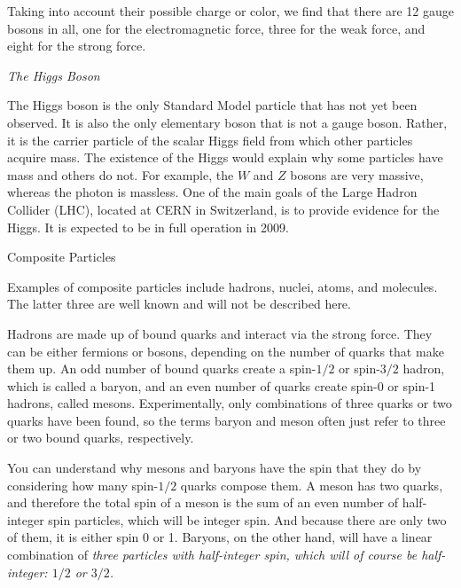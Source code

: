 \documentclass[12pt,epsf]{article}
\makeatletter
\def\subsection{\@startsection{subsection}{2}{\z@}{2.3ex plus .2ex}
 {2.3ex plus .2ex}{\bf}}
\makeatother
\begin{document}
Taking into account their possible charge or color, we find that there
are 12 gauge bosons in all, one for the electromagnetic force, three for the
weak force, and eight for the strong force. 

\begin{center}
\it The Higgs Boson \rm
\end{center}

The Higgs boson is the only Standard Model particle that has not yet
been observed.	It is also the only elementary boson that is not a
gauge boson.  Rather, it is the carrier particle of the scalar Higgs
field from which other particles acquire mass.	The existence of the
Higgs would explain why some particles have mass and others do not. 
For example, the $W$ and $Z$ bosons are very massive, whereas the
photon is massless.  One of the main goals of the Large Hadron Collider
(LHC), located at CERN in Switzerland, is to provide evidence for
the Higgs.  It is expected to be in full operation in 2009.

\subsection{Composite Particles}

Examples of composite particles include hadrons, nuclei, atoms, and
molecules.  The latter three are well known and will not be
described here. 

Hadrons are made up of bound quarks and interact via the strong force.
They can be either fermions or bosons, depending on the number of
quarks that make them up. An odd number of bound quarks create a
spin-$1/2$ or spin-$3/2$ hadron, which is called a baryon, and an even
number of quarks create spin-0 or spin-1 hadrons, called mesons.
Experimentally, only combinations of three quarks or two quarks have
been found, so the terms baryon and meson often just refer to three or
two bound quarks, respectively.

You can understand why mesons and baryons have the spin that they do by
considering how many spin-$1/2$ quarks compose them.  A meson has two
quarks, and therefore the total spin of a meson is the sum of an even
number of half-integer spin particles, which will be integer spin.  And
because there are only two of them, it is either spin 0 or 1. 
Baryons, on the other hand, will have a linear combination of \it three
\rm particles with half-integer spin, which will of course be
half-integer: $1/2$ or $3/2$. 
\end{document}
